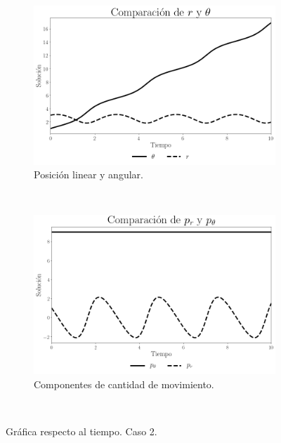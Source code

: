 \documentclass[12pt,letterpaper]{article}
\begin{document}

\begin{figure}
    \centering
    \begin{subfigure}[b]{0.8\textwidth}
        \includegraphics[width=\textwidth]{hamilton_case04_r_theta}
        \caption{Posición linear y angular.}
        \label{fig:case 4 q hamilton}
    \end{subfigure}
    ~ %
    \begin{subfigure}[b]{0.8\textwidth}
        \includegraphics[width=\textwidth]{hamilton_case04_pr_ptheta}
        \caption{Componentes de cantidad de movimiento.}
        \label{fig:case 4 p hamilton}
    \end{subfigure}
    ~ %
    \caption{Gráfica respecto al tiempo. Caso 2.}\label{fig:case 4 time plot hamilton}
\end{figure}
\end{document}
